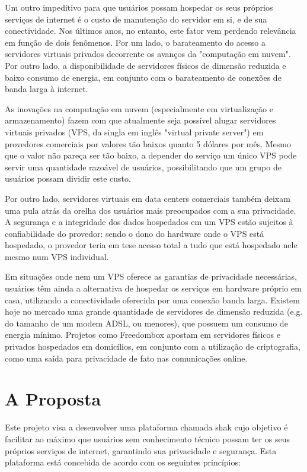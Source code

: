 \begin{anexosenv}
Um outro impeditivo para que usuários possam hospedar os seus próprios serviços
de internet é o custo de manutenção do servidor em si, e de sua conectividade.
Nos últimos anos, no entanto, este fator vem perdendo relevância em função de
dois fenômenos. Por um lado, o barateamento do acesso a servidores virtuais
privados decorrente os avanços da "computação em nuvem". Por outro lado, a
disponibilidade de servidores físicos de dimensão reduzida e baixo consumo de
energia, em conjunto com o barateamento de conexões de banda larga à internet.

As inovações na computação em nuvem (especialmente em virtualização e
armazenamento) fazem com que atualmente seja possível alugar servidores
virtuais privados (VPS, da singla em inglês "virtual private server") em
provedores comerciais por valores tão baixos quanto 5 dólares por mês. Mesmo
que o valor não pareça ser tão baixo, a depender do serviço um único VPS pode
servir uma quantidade razoável de usuários, possibilitando que um grupo de
usuários possam dividir este custo.

Por outro lado, servidores virtuais em data centers comerciais também deixam
uma pula atrás da orelha dos usuários mais preocupados com a sua privacidade. A
segurança e a integridade dos dados hospedados em um VPS estão sujeitos à
confiabilidade do provedor: sendo o dono do hardware onde o VPS está
hospedado, o provedor teria em tese acesso total a tudo que está hospedado nele
mesmo num VPS individual.

Em situações onde nem um VPS oferece as garantias de privacidade necessárias,
usuários têm ainda a alternativa de hospedar os serviços em hardware próprio
em casa, utilizando a conectividade oferecida por uma conexão banda larga.
Existem hoje no mercado uma grande quantidade de servidores de dimensão
reduzida (e.g. do tamanho de um modem ADSL, ou menores), que possuem um consumo
de energia mínimo. Projetos como Freedombox apostam em servidores
físicos e privados hospedados em domicílios, em conjunto com a utilização de
criptografia, como uma saída para privacidade de fato nas comunicações
online.

\section{A Proposta}

Este projeto visa a desenvolver uma plataforma chamada shak cujo objetivo é
facilitar ao máximo que usuários sem conhecimento técnico possam ter os seus
próprios serviços de internet, garantindo sua privacidade e segurança. Esta
plataforma está concebida de acordo com os seguintes princípios:


\end{anexosenv}
